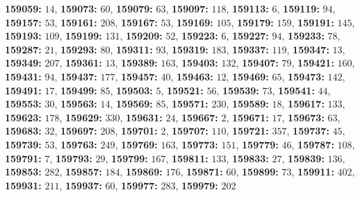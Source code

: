 \textsf{\bfseries 159059:} $14$, \textsf{\bfseries 159073:} $60$, \textsf{\bfseries 159079:} $63$, \textsf{\bfseries 159097:} $118$, \textsf{\bfseries 159113:} $6$, \textsf{\bfseries 159119:} $94$, \textsf{\bfseries 159157:} $53$, \textsf{\bfseries 159161:} $208$, \textsf{\bfseries 159167:} $53$, \textsf{\bfseries 159169:} $105$, \textsf{\bfseries 159179:} $159$, \textsf{\bfseries 159191:} $145$, \textsf{\bfseries 159193:} $109$, \textsf{\bfseries 159199:} $131$, \textsf{\bfseries 159209:} $52$, \textsf{\bfseries 159223:} $6$, \textsf{\bfseries 159227:} $94$, \textsf{\bfseries 159233:} $78$, \textsf{\bfseries 159287:} $21$, \textsf{\bfseries 159293:} $80$, \textsf{\bfseries 159311:} $93$, \textsf{\bfseries 159319:} $183$, \textsf{\bfseries 159337:} $119$, \textsf{\bfseries 159347:} $13$, \textsf{\bfseries 159349:} $207$, \textsf{\bfseries 159361:} $13$, \textsf{\bfseries 159389:} $163$, \textsf{\bfseries 159403:} $132$, \textsf{\bfseries 159407:} $79$, \textsf{\bfseries 159421:} $160$, \textsf{\bfseries 159431:} $94$, \textsf{\bfseries 159437:} $177$, \textsf{\bfseries 159457:} $40$, \textsf{\bfseries 159463:} $12$, \textsf{\bfseries 159469:} $65$, \textsf{\bfseries 159473:} $142$, \textsf{\bfseries 159491:} $17$, \textsf{\bfseries 159499:} $85$, \textsf{\bfseries 159503:} $5$, \textsf{\bfseries 159521:} $56$, \textsf{\bfseries 159539:} $73$, \textsf{\bfseries 159541:} $44$, \textsf{\bfseries 159553:} $30$, \textsf{\bfseries 159563:} $14$, \textsf{\bfseries 159569:} $85$, \textsf{\bfseries 159571:} $230$, \textsf{\bfseries 159589:} $18$, \textsf{\bfseries 159617:} $133$, \textsf{\bfseries 159623:} $178$, \textsf{\bfseries 159629:} $330$, \textsf{\bfseries 159631:} $24$, \textsf{\bfseries 159667:} $2$, \textsf{\bfseries 159671:} $17$, \textsf{\bfseries 159673:} $63$, \textsf{\bfseries 159683:} $32$, \textsf{\bfseries 159697:} $208$, \textsf{\bfseries 159701:} $2$, \textsf{\bfseries 159707:} $110$, \textsf{\bfseries 159721:} $357$, \textsf{\bfseries 159737:} $45$, \textsf{\bfseries 159739:} $53$, \textsf{\bfseries 159763:} $249$, \textsf{\bfseries 159769:} $163$, \textsf{\bfseries 159773:} $151$, \textsf{\bfseries 159779:} $46$, \textsf{\bfseries 159787:} $108$, \textsf{\bfseries 159791:} $7$, \textsf{\bfseries 159793:} $29$, \textsf{\bfseries 159799:} $167$, \textsf{\bfseries 159811:} $133$, \textsf{\bfseries 159833:} $27$, \textsf{\bfseries 159839:} $136$, \textsf{\bfseries 159853:} $282$, \textsf{\bfseries 159857:} $184$, \textsf{\bfseries 159869:} $176$, \textsf{\bfseries 159871:} $60$, \textsf{\bfseries 159899:} $73$, \textsf{\bfseries 159911:} $402$, \textsf{\bfseries 159931:} $211$, \textsf{\bfseries 159937:} $60$, \textsf{\bfseries 159977:} $283$, \textsf{\bfseries 159979:} $202$